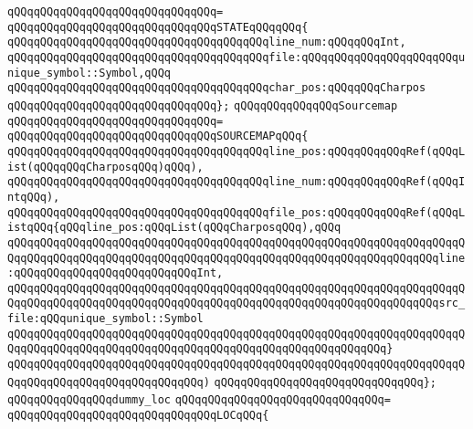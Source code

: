 \verb|qQQqqQQqqQQqqQQqqQQqqQQqqQQqqQQq=|\newline
\verb|qQQqqQQqqQQqqQQqqQQqqQQqqQQqqQQqSTATEqQQqqQQq{|\newline
\verb|qQQqqQQqqQQqqQQqqQQqqQQqqQQqqQQqqQQqqQQqline_num:qQQqqQQqInt,|\newline
\verb|qQQqqQQqqQQqqQQqqQQqqQQqqQQqqQQqqQQqqQQqfile:qQQqqQQqqQQqqQQqqQQqqQQqunique_symbol::Symbol,qQQq|\newline
\verb|qQQqqQQqqQQqqQQqqQQqqQQqqQQqqQQqqQQqqQQqchar_pos:qQQqqQQqCharpos|\newline
\verb|qQQqqQQqqQQqqQQqqQQqqQQqqQQqqQQq};|\newline
\newline
\verb|qQQqqQQqqQQqqQQqSourcemap|\newline
\verb|qQQqqQQqqQQqqQQqqQQqqQQqqQQqqQQq=|\newline
\verb|qQQqqQQqqQQqqQQqqQQqqQQqqQQqqQQqSOURCEMAPqQQq{|\newline
\verb|qQQqqQQqqQQqqQQqqQQqqQQqqQQqqQQqqQQqqQQqline_pos:qQQqqQQqqQQqRef(qQQqList(qQQqqQQqCharposqQQq)qQQq),|\newline
\verb|qQQqqQQqqQQqqQQqqQQqqQQqqQQqqQQqqQQqqQQqline_num:qQQqqQQqqQQqRef(qQQqIntqQQq),|\newline
\verb|qQQqqQQqqQQqqQQqqQQqqQQqqQQqqQQqqQQqqQQqfile_pos:qQQqqQQqqQQqRef(qQQqListqQQq{qQQqline_pos:qQQqList(qQQqCharposqQQq),qQQq|\newline
\verb|qQQqqQQqqQQqqQQqqQQqqQQqqQQqqQQqqQQqqQQqqQQqqQQqqQQqqQQqqQQqqQQqqQQqqQQqqQQqqQQqqQQqqQQqqQQqqQQqqQQqqQQqqQQqqQQqqQQqqQQqqQQqqQQqqQQqqQQqline:qQQqqQQqqQQqqQQqqQQqqQQqqQQqInt,|\newline
\verb|qQQqqQQqqQQqqQQqqQQqqQQqqQQqqQQqqQQqqQQqqQQqqQQqqQQqqQQqqQQqqQQqqQQqqQQqqQQqqQQqqQQqqQQqqQQqqQQqqQQqqQQqqQQqqQQqqQQqqQQqqQQqqQQqqQQqqQQqsrc_file:qQQqunique_symbol::Symbol|\newline
\verb|qQQqqQQqqQQqqQQqqQQqqQQqqQQqqQQqqQQqqQQqqQQqqQQqqQQqqQQqqQQqqQQqqQQqqQQqqQQqqQQqqQQqqQQqqQQqqQQqqQQqqQQqqQQqqQQqqQQqqQQqqQQqqQQq}|\newline
\verb|qQQqqQQqqQQqqQQqqQQqqQQqqQQqqQQqqQQqqQQqqQQqqQQqqQQqqQQqqQQqqQQqqQQqqQQqqQQqqQQqqQQqqQQqqQQqqQQqqQQq)|\newline
\verb|qQQqqQQqqQQqqQQqqQQqqQQqqQQqqQQq};|\newline
\newline
\verb|qQQqqQQqqQQqqQQqdummy_loc|\newline
\verb|qQQqqQQqqQQqqQQqqQQqqQQqqQQqqQQq=|\newline
\verb|qQQqqQQqqQQqqQQqqQQqqQQqqQQqqQQqLOCqQQq{|\newline
